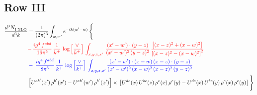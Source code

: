 \documentclass[9pt]{article}
\newcommand{\old}[1]{{\color{red}#1}}
\newcommand{\nc}{\color{blue}}
\numberwithin{equation}{section}
\begin{document}
\subsection{Row III}
\begin{align}
   \frac{d^{3}N_{1\,\rm NLO}^{\rm}}{d^{3}k}  & = \frac{1}{(2\pi)^{3}}  \int_{w, w^\prime} e^{-ik(w^\prime-w)}\, \Bigg\{\notag \\ &   \old{-\,\frac{ig^{4}\,f^{abd}}{16\pi^{5}}\,\frac{1}{k^{+}}\,\log{\left[\frac{\vee}{k^{+}}\right]} \,\int_{x,y,z,x'}\, \frac{(x'-w')\cdot (y-z)}{(x'-w')^{2}\,(y-z)^{2}}\,\frac{\left[(x-z)^{2}+(x-w)^{2}\right]}{\left[(x-z)^{2}-(x-w)^{2}\right]^{2}}}\notag \\ & \nc -\,\frac{ig^{4}\,f^{abd}}{8\pi^{5}}\,\frac{1}{k^{+}}\,\log{\left[\frac{\vee}{k^{+}}\right]}\,\int_{x,y,z,x'}\frac{(x'-w')\cdot (x-w)\, (x-z)\cdot (y-z)}{(x'-w')^{2}\, (x-w)^{2}\, (x-z)^{2}\, (y-z)^{2}}\notag \\ & \left[U^{ab'}(x')\,\rho^{b'}(x')-U^{ab'}(w')\, \rho^{b'}(x')\right]\times\, \left[U^{de}(x)\,U^{bc}(z)\, \rho^{e}(x)\,\rho^{c}(y)-U^{de}(x)\,U^{bc}(y)\,\rho^{e}(x)\,\rho^{c}(y)\right]\Bigg\}
\end{align}
\end{document}
